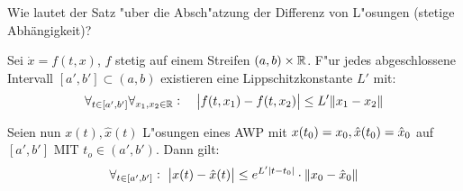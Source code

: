 \documentclass[9pt]{article}
\newcommand{\R}[1]{%
	\ifthenelse{\equal{#1}{}}
		{\mathbb{R}}
		{\mathbb{R}^#1}}%
\newenvironment{field}{}{\newpage}
\newif\ifnote
\newenvironment{note}{\notetrue}{\notefalse}
\newcommand{\localtag}{}
\newcommand{\globaltag}{}
\newcommand{\uuid}{}
\newcommand{\tags}[1]{
    \ifnote 
        \renewcommand{\localtag}{#1}
    \else
        \renewcommand{\globaltag}{#1}
    \fi 
    }
\newcommand{\xplain}[1]{\renewcommand{\uuid}{#1}}
\begin{document}
\begin{note}
	\xplain{UUID}
	\tags{satz, 3.6}
	
	\begin{field}  %
		Wie lautet der Satz "uber die Absch"atzung der Differenz von L"osungen (stetige Abhängigkeit)?
	\end{field}
	
	\begin{field}  %
		Sei $\dot{x}=f(t,x)$, $f$ stetig auf einem Streifen $(a,b)\times \R{}$. F"ur jedes abgeschlossene Intervall $[a',b'] \subset (a,b)$ existieren eine Lippschitzkonstante $L'$ mit:
		\begin{equation*}
			\forall_{t \in [a', b']} \forall_{x_1, x_2 \in \R{}}: \quad
			\abs{f(t,x_1) - f(t,x_2)} \leq L'\norm{x_1 - x_2}
		\end{equation*}
		
		Seien nun $x(t), \hat{x}(t)$ L"osungen eines AWP mit $x(t_0)=x_0, \\  \hat{x}(t_0) = \hat{x}_0$
		auf $[a',b']$ MIT $t_o \in (a',b')$. Dann gilt:
		\begin{equation*}
			\forall_{t \in [a', b']}: \ \abs{x(t) - \hat{x}(t)} \leq e^{L'\abs{t-t_0}} \cdot \norm{x_0-\hat{x}_0}
		\end{equation*}
	\end{field}
\end{note}
\end{document}

